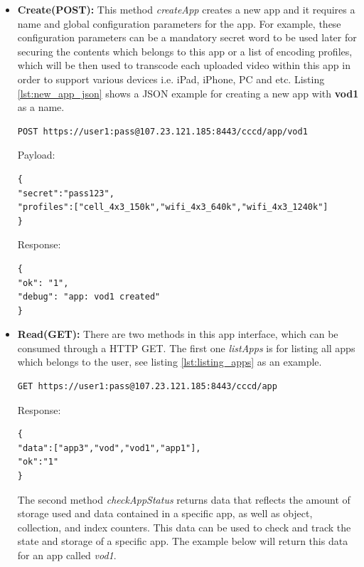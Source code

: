 \begin{itemize}
\item \textbf{Create(POST):} This method \textit{createApp} creates a new app and it requires a name and global configuration parameters for the app. For example, these configuration parameters can be a mandatory secret word to be used later for securing the contents which belongs to this app or a list of encoding profiles, which will be then used to transcode each uploaded video within this app in order to support various devices i.e. iPad, iPhone, PC and etc. Listing \ref{lst:new_app_json} shows a \ac{JSON} example for creating a new app with \textbf{vod1} as a name.

\begin{code}
\begin{verbatim}
POST https://user1:pass@107.23.121.185:8443/cccd/app/vod1
\end{verbatim}
Payload:
\begin{verbatim}
{
"secret":"pass123",
"profiles":["cell_4x3_150k","wifi_4x3_640k","wifi_4x3_1240k"]
}
\end{verbatim}
Response:
\begin{verbatim}
{
"ok": "1",
"debug": "app: vod1 created"
}
\end{verbatim}
\caption{Creating a new app}
\label{lst:new_app_json}
\end{code}

\item \textbf{Read(GET):} There are two methods in this app interface, which can be consumed through a \ac{HTTP} GET. The first one \textit{listApps} is for listing all apps which belongs to the user, see listing \ref{lst:listing_apps} as an example. 

\begin{code}
\begin{verbatim}
GET https://user1:pass@107.23.121.185:8443/cccd/app
\end{verbatim}
Response:
\begin{verbatim}
{
"data":["app3","vod","vod1","app1"],
"ok":"1"
}
\end{verbatim}
\caption{Listing all apps which belong to a user}
\label{lst:listing_apps}
\end{code}


The second method \textit{checkAppStatus} returns data that reflects the amount of storage used and data contained in a specific app, as well as object, collection, and index counters. This data can be used to check and track the state and storage of a specific app. The example below will return this data for an app called \textit{vod1}.


\end{itemize}
